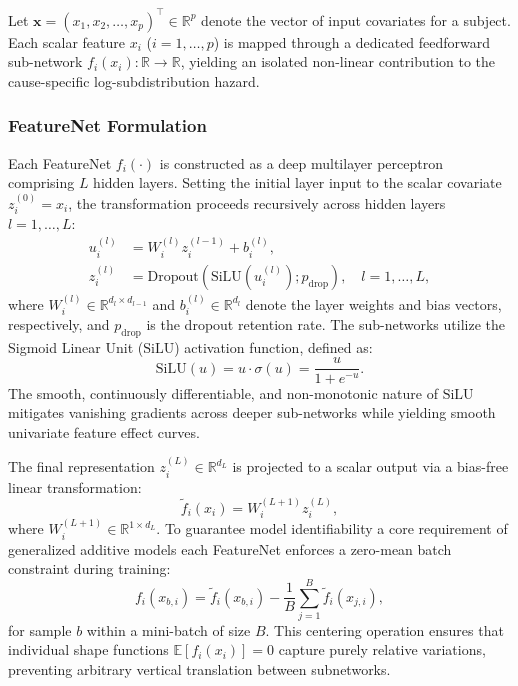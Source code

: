 \documentclass[a4paper,twoside,12pt]{report}
\begin{document}
Let $\mathbf{x} = (x_1, x_2, \dots, x_p)^\top \in \mathbb{R}^p$ denote the vector of input covariates for a subject. Each scalar feature $x_i$ ($i = 1, \dots, p$) is mapped through a dedicated feedforward sub-network $f_i(x_i): \mathbb{R} \to \mathbb{R}$, yielding an isolated non-linear contribution to the cause-specific log-subdistribution hazard.

\subsubsection{FeatureNet Formulation}
Each FeatureNet $f_i(\cdot)$ is constructed as a deep multilayer perceptron comprising $L$ hidden layers. Setting the initial layer input to the scalar covariate $z_i^{(0)} = x_i$, the transformation proceeds recursively across hidden layers $l = 1, \dots, L$:
\begin{align}
    u_i^{(l)} &= W_i^{(l)} z_i^{(l-1)} + b_i^{(l)}, \\
    z_i^{(l)} &= \text{Dropout}\left( \text{SiLU}\left(u_i^{(l)}\right); p_{\text{drop}} \right), \quad l = 1, \dots, L,
\end{align}
where $W_i^{(l)} \in \mathbb{R}^{d_l \times d_{l-1}}$ and $b_i^{(l)} \in \mathbb{R}^{d_l}$ denote the layer weights and bias vectors, respectively, and $p_{\text{drop}}$ is the dropout retention rate. The sub-networks utilize the Sigmoid Linear Unit ($\text{SiLU}$) activation function, defined as:
\begin{equation}
    \text{SiLU}(u) = u \cdot \sigma(u) = \frac{u}{1 + e^{-u}}.
\end{equation}
The smooth, continuously differentiable, and non-monotonic nature of $\text{SiLU}$ mitigates vanishing gradients across deeper sub-networks while yielding smooth univariate feature effect curves.

The final representation $z_i^{(L)} \in \mathbb{R}^{d_L}$ is projected to a scalar output via a bias-free linear transformation:
\begin{equation}
    \tilde{f}_i(x_i) = W_i^{(L+1)} z_i^{(L)},
\end{equation}
where $W_i^{(L+1)} \in \mathbb{R}^{1 \times d_L}$. To guarantee model identifiability a core requirement of generalized additive models each FeatureNet enforces a zero-mean batch constraint during training:
\begin{equation}
    f_i(x_{b,i}) = \tilde{f}_i(x_{b,i}) - \frac{1}{B} \sum_{j=1}^B \tilde{f}_i(x_{j,i}),
\end{equation}
for sample $b$ within a mini-batch of size $B$. This centering operation ensures that individual shape functions $\mathbb{E}[f_i(x_i)] = 0$ capture purely relative variations, preventing arbitrary vertical translation between subnetworks.
\end{document}
